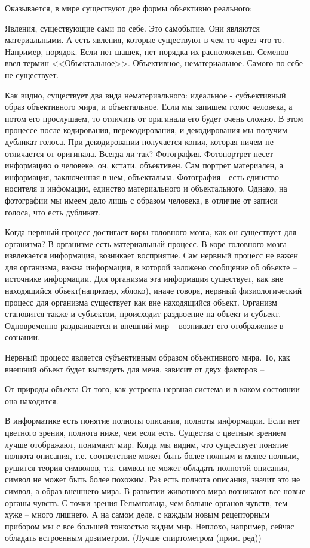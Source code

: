 Оказывается, в мире существуют две формы объективно реального:

    Явления, существующие сами по себе. Это самобытие. Они являются материальными.
    А есть явления, которые существуют в чем-то через что-то. Например, порядок. Если нет шашек, нет порядка их расположения. Семенов ввел термин <<Объектальное>>. Объективное, нематериальное. Самого по себе не существует.

Как видно, существует два вида нематериального: идеальное - субъективный образ объективного мира, и объектальное. Если мы запишем голос человека, а потом его прослушаем, то отличить от оригинала его будет очень сложно. В этом процессе после кодирования, перекодирования, и декодирования мы получим дубликат голоса. При декодировании получается копия, которая ничем не отличается от оригинала. Всегда ли так? Фотография. Фотопортрет несет информацию о человеке, он, кстати, объективен. Сам портрет материален, а информация, заключенная в нем, объектальна. Фотография - есть единство носителя и инфомации, единство материального и объектального. Однако, на фотографии мы имеем дело лишь с образом человека, в отличие от записи голоса, что есть дубликат.

Когда нервный процесс достигает коры головного мозга, как он существует для организма? В организме есть материальный процесс. В коре головного мозга извлекается информация, возникает восприятие. Сам нервный процесс не важен для организма, важна информация, в которой заложено сообщение об объекте – источнике информации. Для организма эта информация существует, как вне находящийся объект(например, яблоко), иначе говоря, нервный физиологический процесс для организма существует как вне находящийся объект. Организм становится также и субъектом, происходит раздвоение на объект и субъект. Одновременно раздваивается и внешний мир – возникает его отображение в сознании.

Нервный процесс является субъективным образом объективного мира. То, как внешний объект будет выглядеть для меня, зависит от двух факторов –

    От природы объекта
    От того, как устроена нервная система и в каком состоянии она находится.

В информатике есть понятие полноты описания, полноты информации. Если нет цветного зрения, полнота ниже, чем если есть. Существа с цветным зрением лучше отображают, понимают мир. Когда мы видим, что существует понятие полнота описания, т.е. соответствие может быть более полным и менее полным, рушится теория символов, т.к. символ не может обладать полнотой описания, символ не может быть более похожим. Раз есть полнота описания, значит это не символ, а образ внешнего мира. В развитии животного мира возникают все новые органы чувств. С точки зрения Гельмгольца, чем больше органов чувств, тем хуже – много лишнего. А на самом деле, с каждым новым рецепторным прибором мы с все большей тонкостью видим мир. Неплохо, например, сейчас обладать встроенным дозиметром. (Лучше спиртометром (прим. ред))

